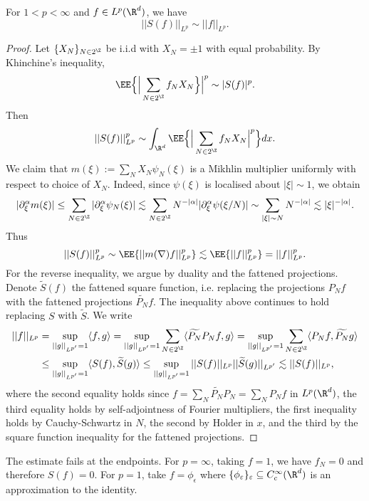 \begin{theorem}\label{thm:square}
	For $1 < p < \infty$ and $f \in L^p (\R^d)$, we have
		\[ || S(f)||_{L^p} \sim ||f||_{L^p}. \]
\end{theorem}

\begin{proof}
	Let $\{X_N\}_{N \in 2^\Z}$ be i.i.d with $X_N = \pm 1$ with equal probability. By Khinchine's inequality, 
		\[ \EE \Big\{ \Big|\sum_{N \in 2^\Z} f_N X_N \Big\}\Big|^p  \sim |S(f)|^p. \]
	Then 
		\[ ||S(f)||_{L^p}^p \sim \int_{\R^d} \EE \Big\{ \Big|\sum_{N \in 2^\Z} f_N X_N \Big|^p \Big\} dx. \]	
	We claim that $m (\xi) := \sum_N X_N \psi_N (\xi)$ is a Mikhlin multiplier uniformly with respect to choice of $X_N$. Indeed, since $\psi (\xi)$ is localised about $|\xi| \sim 1$, we obtain
		\[ |\partial^\alpha_\xi m (\xi)| \leq \sum_{N \in 2^\Z} |\partial^\alpha_\xi \psi_N (\xi)| \lesssim \sum_{N \in 2^\Z} N^{-|\alpha|} |\partial^\alpha_\xi \psi(\xi/N)| \sim \sum_{|\xi| \sim N} N^{-|\alpha|} \lesssim |\xi|^{-|\alpha|}.  \]
	Thus
		\[ ||S(f)||_{L^p}^p \sim \EE \{ || m(\nabla) f ||_{L^p}^p \}\lesssim \EE \{ ||f||_{L^p}^p \} = ||f||_{L^p}^p. \]	
	For the reverse inequality, we argue by duality and the fattened projections. Denote $\widetilde S(f)$ the fattened square function, i.e. replacing the projections $P_N f$ with the fattened projections $\widetilde{P_N} f$. The inequality above continues to hold replacing $S$ with $\widetilde S$. We write
	\begin{align*}
		||f||_{L^p}
			&= \sup_{||g||_{L^{p'}} = 1} \langle f, g \rangle = \sup_{||g||_{L^{p'}} = 1} \sum_{N \in 2^\Z} \langle \widetilde{P_N} P_N f, g \rangle = \sup_{||g||_{L^{p'}} = 1} \sum_{N \in 2^\Z} \langle  P_N f, \widetilde{P_N} g \rangle \\
			&\leq  \sup_{||g||_{L^{p'}} = 1} \langle S(f), \widetilde{S} (g) \rangle \leq  \sup_{||g||_{L^{p'}} = 1} || S(f) ||_{L^p} ||\widetilde{S}(g)||_{L^{p'}} \lesssim ||S(f)||_{L^p},
	\end{align*}
	where the second equality holds since $f =\sum_N \widetilde{P_N} P_N = \sum_N P_N f$ in $L^p (\R^d)$, the third equality holds by self-adjointness of Fourier multipliers, the first inequality holds by Cauchy-Schwartz in $N$, the second by Holder in $x$, and the third by the square function inequality for the fattened projections. 
\end{proof}	

\begin{remark}
	The estimate fails at the endpoints. For $p = \infty$, taking $f = 1$, we have $f_N = 0$ and therefore $S(f) = 0$. For $p = 1$, take $f = \phi_\epsilon$ where $\{\phi_\epsilon\}_\epsilon \subseteq C^\infty_c (\R^d)$ is an approximation to the identity. 
\end{remark}
